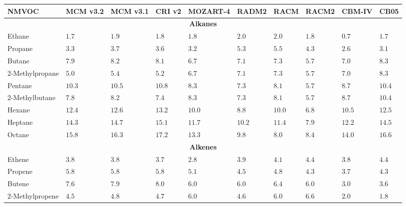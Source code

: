 {%
    \renewcommand{\arraystretch}{1.1}%
    \begin{table}%
        \begin{center}%
            \begin{tabular}{llllllllll}%
                \hline \hline
                \textbf{NMVOC} & \textbf{MCM v3.2} & \textbf{MCM v3.1} & \textbf{CRI v2} & \textbf{MOZART-4} & \textbf{RADM2} & \textbf{RACM} & \textbf{RACM2} & \textbf{CBM-IV} & \textbf{CB05} \\ 
                \hline \hline \multicolumn{10}{c}{\textbf{Alkanes}}  \\ \hline
                Ethane & $1.7$ & $1.9$ & $1.8$ & $1.8$ & $2.0$ & $2.0$ & $1.8$ & $0.7$ & $1.7$ \\
                Propane & $3.3$ & $3.7$ & $3.6$ & $3.2$ & $5.3$ & $5.5$ & $4.3$ & $2.6$ & $3.1$ \\
                Butane & $7.9$ & $8.2$ & $8.1$ & $6.7$ & $7.1$ & $7.3$ & $5.7$ & $7.0$ &$8.3$ \\
                $2$-Methylpropane & $5.0$ & $5.4$ & $5.2$ & $6.7$ & $7.1$ & $7.3$ & $5.7$ & $7.0$ & $8.3$ \\
                Pentane & $10.3$ & $10.5$ & $10.8$ & $8.3$ & $7.3$ & $8.1$ & $5.7$ & $8.7$ & $10.4$ \\
                $2$-Methylbutane & $7.8$ & $8.2$ & $7.4$ & $8.3$ & $7.3$ & $8.1$ & $5.7$ & $8.7$ & $10.4$ \\
                Hexane & $12.4$ & $12.6$ & $13.2$ & $10.0$ & $8.8$ & $10.0$ & $6.8$ & $10.5$ & $12.5$ \\
                Heptane & $14.3$ & $14.7$ & $15.1$ & $11.7$ & $10.2$ & $11.4$ & $7.9$ & $12.2$ & $14.5$ \\
                Octane & $15.8$ & $16.3$ & $17.2$ & $13.3$ & $9.8$ & $8.0$ & $8.4$ & $14.0$ & $16.6$ \\ \hline
                \multicolumn{10}{c}{\textbf{Alkenes}} \\ \hline
                Ethene & $3.8$ & $3.8$ & $3.7$ & $2.8$ & $3.9$ & $4.1$ & $4.4$ & $3.8$ & $4.4$ \\
                Propene & $5.8$ & $5.8$ & $5.8$ & $5.1$ & $4.5$ & $4.8$ & $4.3$ & $3.7$ & $4.3$ \\
                Butene & $7.6$ & $7.9$ & $8.0$ & $6.0$ & $6.0$ & $6.4$ & $6.0$ & $3.0$ & $3.6$ \\
                $2$-Methylpropene & $4.5$ & $4.8$ & $4.7$ & $6.0$ & $4.6$ & $6.0$ & $6.6$ & $2.0$ & $1.8$ \\

\end{tabular}
\end{center}
\end{table}}

